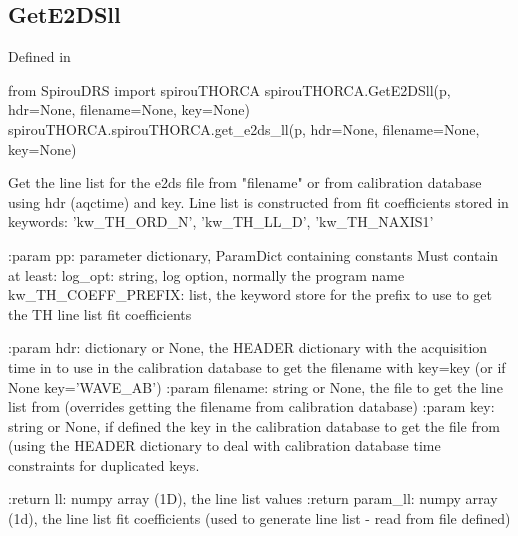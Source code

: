 \noindent\begin{minipage}{\textwidth}
\subsection{GetE2DSll}

Defined in \spirouTHORCA{}

\begin{pythonbox}
from SpirouDRS import spirouTHORCA
spirouTHORCA.GetE2DSll(p, hdr=None, filename=None, key=None)
spirouTHORCA.spirouTHORCA.get_e2ds_ll(p, hdr=None, filename=None, key=None)
\end{pythonbox}

\begin{pythondocstring}
Get the line list for the e2ds file from "filename" or from calibration
database using hdr (aqctime) and key. Line list is constructed from
fit coefficients stored in keywords:
    'kw_TH_ORD_N', 'kw_TH_LL_D', 'kw_TH_NAXIS1'

:param pp: parameter dictionary, ParamDict containing constants
    Must contain at least:
            log_opt: string, log option, normally the program name
            kw_TH_COEFF_PREFIX: list, the keyword store for the prefix to
                                use to get the TH line list fit coefficients

:param hdr: dictionary or None, the HEADER dictionary with the acquisition
            time in to use in the calibration database to get the filename
            with key=key (or if None key='WAVE_AB')
:param filename: string or None, the file to get the line list from
                 (overrides getting the filename from calibration database)
:param key: string or None, if defined the key in the calibration database
            to get the file from (using the HEADER dictionary to deal with
            calibration database time constraints for duplicated keys.

:return ll: numpy array (1D), the line list values
:return param_ll: numpy array (1d), the line list fit coefficients (used to
                  generate line list - read from file defined)
\end{pythondocstring}
\end{minipage}

